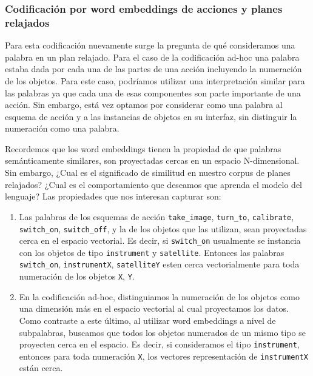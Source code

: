 \subsubsection{Codificación por word embeddings de acciones y planes relajados}

Para esta codificación nuevamente surge la pregunta de qué consideramos una palabra en un plan relajado. Para el caso de la codificación ad-hoc una palabra estaba dada por cada una de las partes de una acción incluyendo la numeración de los objetos. Para este caso, podríamos utilizar una interpretación similar para las palabras ya que cada una de esas componentes son parte importante de una acción. Sin embargo, está vez optamos por considerar como una palabra al esquema de acción y a las instancias de objetos en su interfaz, sin distinguir la numeración como una palabra.

Recordemos que los word embeddings tienen la propiedad de que palabras semánticamente similares, son proyectadas cercas en un espacio N-dimensional. Sin embargo, ¿Cual es el significado de similitud en nuestro corpus de planes relajados? ¿Cual es el comportamiento que deseamos que aprenda el modelo del lenguaje? Las propiedades que nos interesan capturar son:

\begin{enumerate}
    \item Las palabras de los esquemas de acción \verb|take_image|, \verb|turn_to|, \verb|calibrate|, \verb|switch_on|, \verb|switch_off|, y la de los objetos que las utilizan, sean proyectadas cerca en el espacio vectorial. Es decir, si \verb|switch_on| usualmente se instancia con los objetos de tipo \verb|instrument| y \verb|satellite|. Entonces las palabras \verb|switch_on|, \verb|instrumentX|, \verb|satelliteY| esten cerca vectorialmente para toda numeración de los objetos \verb|X|, \verb|Y|.
    \item En la codificación ad-hoc, distinguiamos la numeración de los objetos como una dimensión más en el espacio vectorial al cual proyectamos los datos. Como contraste a este último, al utilizar word embeddings a nivel de subpalabras, buscamos que todos los objetos numerados de un mismo tipo se proyecten cerca en el espacio. Es decir, si consideramos el tipo \verb|instrument|, entonces para toda numeración \verb|X|, los vectores representación de \verb|instrumentX| están cerca.
\end{enumerate}

